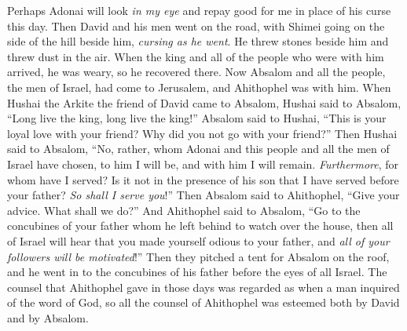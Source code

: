\begin{biblechapter}
\verse Perhaps Adonai will look \textit{in my eye} and repay good for me in place of his curse this day.
\verse Then David and his men went on the road, with Shimei going on the side of the hill beside him, \textit{cursing as he went}. He threw stones beside him and threw dust in the air.
\verse When the king and all of the people who were with him arrived, he was weary, so he recovered there.
 Now Absalom and all the people, the men of Israel, had come to Jerusalem, and Ahithophel was with him.
\verse When Hushai the Arkite the friend of David came to Absalom, Hushai said to Absalom, “Long live the king, long live the king!”
\verse Absalom said to Hushai, “This is your loyal love with your friend? Why did you not go with your friend?”
\verse Then Hushai said to Absalom, “No, rather, whom Adonai and this people and all the men of Israel have chosen, to him I will be, and with him I will remain.
\verse \textit{Furthermore}, for whom have I served? Is it not in the presence of his son that I have served before your father? \textit{So shall I serve you}!”
\verse Then Absalom said to Ahithophel, “Give your advice. What shall we do?”
\verse And Ahithophel said to Absalom, “Go to the concubines of your father whom he left behind to watch over the house, then all of Israel will hear that you made yourself odious to your father, and \textit{all of your followers will be motivated}!”
\verse Then they pitched a tent for Absalom on the roof, and he went in to the concubines of his father before the eyes of all Israel.
\verse The counsel that Ahithophel gave in those days was regarded as when a man inquired of the word of God, so all the counsel of Ahithophel was esteemed both by David and by Absalom.
\end{biblechapter}

